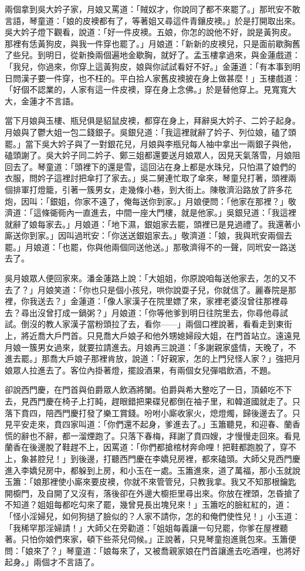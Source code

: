 兩個拿到吳大妗子家，月娘又罵道：「賊奴才，你說同了都不來罷了。」那玳安不敢言語，琴童道：「娘的皮襖都有了，等著姐又尋這件青鑲皮襖。」於是打開取出來。吳大妗子燈下觀看，說道：「好一件皮襖。五娘，你怎的說他不好，說是黃狗皮。那裡有恁黃狗皮，與我一件穿也罷了。」月娘道：「新新的皮襖兒，只是面前歇胸舊了些兒。到明日，從新換兩個遍地金歇胸，就好了。孟玉樓拿過來，與金蓮戲道：「我兒，你過來，你穿上這黃狗皮，娘與你試試看好不好。」金蓮道：「有本事到明日問漢子要一件穿，也不枉的。平白拾人家舊皮襖披在身上做甚麼！」玉樓戲道：「好個不認業的，人家有這一件皮襖，穿在身上念佛。」於是替他穿上。見寬寬大大，金蓮才不言語。

當下月娘與玉樓、瓶兒俱是貂鼠皮襖，都穿在身上，拜辭吳大妗子、二妗子起身。月娘與了鬱大姐一包二錢銀子。吳銀兒道：「我這裡就辭了妗子、列位娘，磕了頭罷。」當下吳大妗子與了一對銀花兒，月娘與李瓶兒每人袖中拿出一兩銀子與他，磕頭謝了。吳大妗子同二妗子、鄭三姐都還要送月娘眾人，因見天氣落雪，月娘阻回去了。琴童道：「頭裡下的還是雪，這回沾在身上都是水珠兒，只怕濕了娘們的衣服，問妗子這裡討把傘打了家去。」吳二舅連忙取了傘來，琴童兒打著，頭裡兩個排軍打燈籠，引著一簇男女，走幾條小巷，到大街上。陳敬濟沿路放了許多花炮，因叫：「銀姐，你家不遠了，俺每送你到家。」月娘便問：「他家在那裡？」敬濟道：「這條衚衕內一直進去，中間一座大門樓，就是他家。」吳銀兒道：「我這裡就辭了娘每家去。」月娘道：「地下濕，銀姐家去罷，頭裡已是見過禮了。我還著小廝送你到家。」因叫過玳安：「你送送銀姐家去。」敬濟道：「娘，我與玳安兩個去罷。」月娘道：「也罷，你與他兩個同送他送。」那敬濟得不的一聲，同玳安一路送去了。

吳月娘眾人便回家來。潘金蓮路上說：「大姐姐，你原說咱每送他家去，怎的又不去了？」月娘笑道：「你也只是個小孩兒，哄你說耍子兒，你就信了。麗春院是那裡，你我送去？」金蓮道：「像人家漢子在院里嫖了來，家裡老婆沒曾往那裡尋去？尋出沒曾打成一鍋粥？」月娘道：「你等他爹到明日往院里去，你尋他尋試試。倒沒的教人家漢子當粉頭拉了去，看你——」兩個口裡說著，看看走到東街上，將近喬大戶門首。只見喬大戶娘子和他外甥媳婦段大姐，在門首站立。遠遠見月娘一簇男女過來，就要拉請進去。月娘再三說道：「多謝親家盛情，天晚了，不進去罷。」那喬大戶娘子那裡肯放，說道：「好親家，怎的上門兒怪人家？」強把月娘眾人拉進去了。客位內掛著燈，擺設酒果，有兩個女兒彈唱飲酒，不題。

卻說西門慶，在門首與伯爵眾人飲酒將闌。伯爵與希大整吃了一日，頂顙吃不下去，見西門慶在椅子上打盹，趕眼錯把果碟兒都倒在袖子里，和韓道國就走了。只落下賁四，陪西門慶打發了樂工賞錢。吩咐小廝收家火，熄燈燭，歸後邊去了。只見平安走來，賁四家叫道：「你們還不起身，爹進去了。」玉簫聽見，和迎春、蘭香慌的辭也不辭，都一溜煙跑了。只落下春梅，拜謝了賁四嫂，才慢慢走回來。看見蘭香在後邊脫了鞋趕不上，因罵道：「你們都搶棺材奔命哩！把鞋都跑脫了，穿不上，象甚腔兒！」到後邊，打聽西門慶在李嬌兒房裡，都來磕頭。大師父見西門慶進入李嬌兒房中，都躲到上房，和小玉在一處。玉簫進來，道了萬福，那小玉就說玉簫：「娘那裡使小廝來要皮襖，你就不來管管兒，只教我拿。我又不知那根鑰匙開櫥門，及自開了又沒有，落後卻在外邊大櫥拒里尋出來。你放在裡頭，怎昏搶了不知道？姐姐每都吃勾來了罷，幾曾見長出塊兒來！」玉簫吃的臉紅紅的，道：「怪小淫婦兒，如何狗撾了臉似的？人家不請你，怎的和俺們使性兒！」小玉道：「我稀罕那淫婦請！」大師父在旁勸道：「姐姐每義讓一句兒罷，你爹在屋裡聽著。只怕你娘們來家，頓下些茶兒伺候。」正說著，只見琴童抱進氈包來。玉簫便問：「娘來了？」琴童道：「娘每來了，又被喬親家娘在門首讓進去吃酒哩，也將好起身。」兩個才不言語了。

